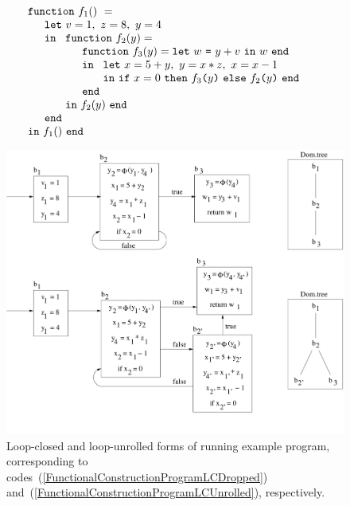 \begin{equation}
\label{FunctionalConstructionProgramLCDropped}
\begin{array}{l}
\texttt{function}\ f_1()\ = \\
  \quad
  \begin{array}{l}
     \texttt{let}\ v = 1, \ 
                   z = 8, \ 
                   y = 4\\
     \texttt{in}\ 
     \begin{array}[t]{l}
       \texttt{function}\ f_2(y) = \\
       \quad \begin{array}{l}  
               \texttt{function}\ f_3(y) = \letin w {y+v} w\\
               \texttt{in}\
               \begin{array}[t]{l}
                  \texttt{let}\ x = {5+y}, \
                                y = {x*z}, \
                                x = {x-1}\\
                  \texttt{in}\ 
                     \ite {x=0} {\call {f_3} {y}} {\call {f_2} {y}}\
                  \texttt{end}
               \end{array}\\
               \texttt{end}
             \end{array}\\
       \texttt{in}\ f_2(y)\ \texttt{end}
     \end{array}\\
     \texttt{end}
  \end{array}\\
  \texttt{in}\ f_1()\ \texttt{end}
\end{array}
\end{equation}
\begin{figure}
\begin{center}
\includegraphics[scale=0.4]{SSAConstructionExample6}
\end{center}
\caption{\label{fig:FunctionalCorrespondenceSSAofLoopClosedProgramNEW} 
Loop-closed and loop-unrolled forms of running example program,
corresponding to codes~(\ref{FunctionalConstructionProgramLCDropped})
and~(\ref{FunctionalConstructionProgramLCUnrolled}), respectively.}
\end{figure}
